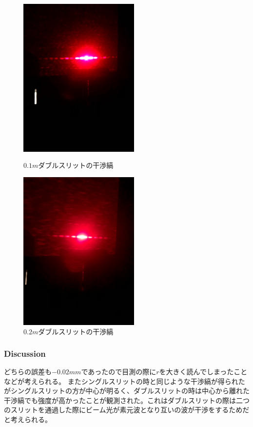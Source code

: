 \documentclass[11pt, a4paper]{jsarticle}
\begin{document}
\begin{figure}[htbp]
 \begin{minipage}{0.45\hsize}
  \begin{center}
   \includegraphics[width=60mm]{fig12.png}
  \end{center}
  \caption{$0.1m$ダブルスリットの干渉縞}
  \label{fig:12}
 \end{minipage}
 \begin{minipage}{0.45\hsize}
  \begin{center}
   \includegraphics[width=60mm]{fig13.png}
  \end{center}
  \caption{$0.2m$ダブルスリットの干渉縞}
  \label{fig:13}
 \end{minipage}
\end{figure}

\subsubsection{Discussion}
どちらの誤差も$-0.02mm$であったので目測の際に$r$を大きく読んでしまったことなどが考えられる。
またシングルスリットの時と同じような干渉縞が得られたがシングルスリットの方が中心が明るく、ダブルスリットの時は中心から離れた干渉縞でも強度が高かったことが観測された。これはダブルスリットの際は二つのスリットを通過した際にビーム光が素元波となり互いの波が干渉をするためだと考えられる。
\end{document}
